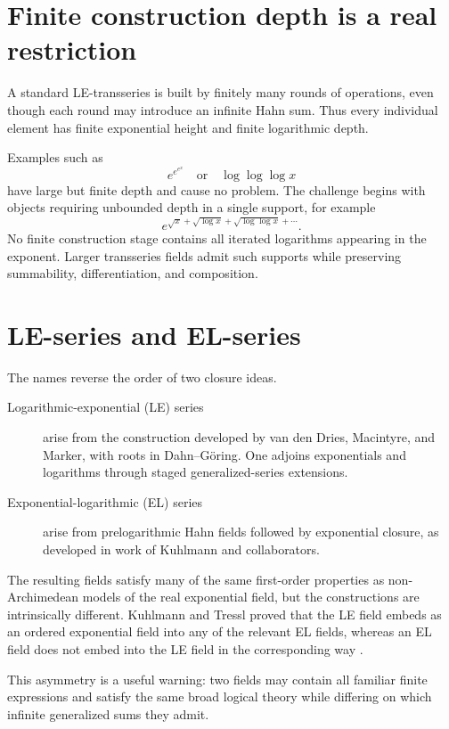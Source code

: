 \documentclass[11pt,openany]{book}
\theoremstyle{definition}
\theoremstyle{plain}
\theoremstyle{remark}
\begin{document}
\section{Finite construction depth is a real restriction}

A standard LE-transseries is built by finitely many rounds of operations, even though each round may introduce an infinite Hahn sum. Thus every individual element has finite exponential height and finite logarithmic depth.

Examples such as
\[
 e^{e^{e^x}}
 \quad\text{or}\quad
 \log\log\log x
\]
have large but finite depth and cause no problem. The challenge begins with objects requiring unbounded depth in a single support, for example
\begin{equation}\label{eq:unbounded-depth-example}
 e^{\sqrt{x}+\sqrt{\log x}+\sqrt{\log\log x}+\cdots}.
\end{equation}
No finite construction stage contains all iterated logarithms appearing in the exponent. Larger transseries fields admit such supports while preserving summability, differentiation, and composition.

\section{LE-series and EL-series}

The names reverse the order of two closure ideas.

\begin{description}
 \item[Logarithmic-exponential (LE) series] arise from the construction developed by van den Dries, Macintyre, and Marker, with roots in Dahn--G\"oring. One adjoins exponentials and logarithms through staged generalized-series extensions.
 \item[Exponential-logarithmic (EL) series] arise from prelogarithmic Hahn fields followed by exponential closure, as developed in work of Kuhlmann and collaborators.
\end{description}

The resulting fields satisfy many of the same first-order properties as non-Archimedean models of the real exponential field, but the constructions are intrinsically different. Kuhlmann and Tressl proved that the LE field embeds as an ordered exponential field into any of the relevant EL fields, whereas an EL field does not embed into the LE field in the corresponding way \cite{kuhlmann-tressl}.

This asymmetry is a useful warning: two fields may contain all familiar finite expressions and satisfy the same broad logical theory while differing on which infinite generalized sums they admit.
\end{document}
